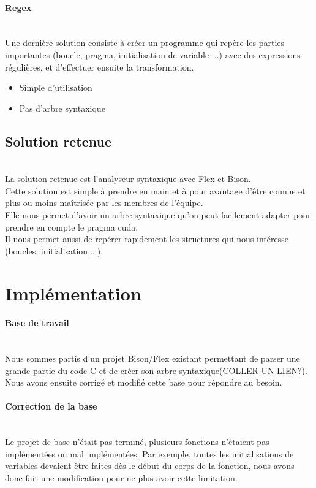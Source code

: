 \documentclass{article}
\begin{document}
	
	\paragraph{Regex}
	~~\\
	\indent
	Une dernière solution consiste à créer un programme qui repère les parties importantes (boucle, pragma, initialisation de variable ...) avec des expressions régulières, et d'effectuer ensuite la transformation.
	\begin{itemize}
		\item Simple d'utilisation
		\item Pas d'arbre syntaxique
	\end{itemize}
		
	
	\subsection{Solution retenue}
	~~\\
	\indent
	La solution retenue est l'analyseur syntaxique avec Flex et Bison. \\Cette solution est simple à prendre en main et à pour avantage d'être connue et plus ou moins maîtrisée par les membres de l'équipe. \\Elle nous permet d'avoir un arbre syntaxique qu'on peut facilement adapter pour prendre en compte le pragma cuda. \\Il nous permet aussi de repérer rapidement les structures qui nous intéresse (boucles, initialisation,...).

	
	\newpage
	
	
	
	
	\section{Implémentation}
	
	\paragraph{Base de travail}
	~~\\
	\indent
	Nous sommes partis d'un projet Bison/Flex existant permettant de parser une grande partie du code C et de créer son arbre syntaxique(COLLER UN LIEN?). Nous avons ensuite corrigé et modifié cette base pour répondre au besoin.
	
	\paragraph{Correction de la base}
	~~\\
	\indent
	Le projet de base n'était pas terminé, plusieurs fonctions n'étaient pas implémentées ou mal implémentées. Par exemple, toutes les initialisations de variables devaient être faites dès le début du corps de la fonction, nous avons donc fait une modification pour ne plus avoir cette limitation.
	
\end{document}

